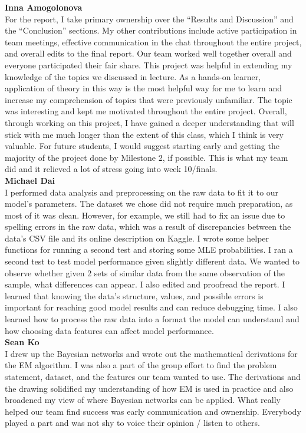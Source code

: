 \documentclass{article}
\begin{document}
\textbf{Inna Amogolonova}\\
For the report, I take primary ownership over the “Results and Discussion” and the “Conclusion” sections. My other contributions include active participation in team meetings, effective communication in the chat throughout the entire project, and overall edits to the final report. Our team worked well together overall and everyone participated their fair share. This project was helpful in extending my knowledge of the topics we discussed in lecture. As a hands-on learner, application of theory in this way is the most helpful way for me to learn and increase my comprehension of topics that were previously unfamiliar. The topic was interesting and kept me motivated throughout the entire project. Overall, through working on this project, I have gained a deeper understanding that will stick with me much longer than the extent of this class, which I think is very valuable. For future students, I would suggest starting early and getting the majority of the project done by Milestone 2, if possible. This is what my team did and it relieved a lot of stress going into week 10/finals. \\


\textbf{Michael Dai}\\
I performed data analysis and preprocessing on the raw data to fit it to our model’s parameters. The dataset we chose did not require much preparation, as most of it was clean. However, for example, we still had to fix an issue due to spelling errors in the raw data, which was a result of discrepancies between the data’s CSV file and its online description on Kaggle. I wrote some helper functions for running a second test and storing some MLE probabilities. I ran a second test to test model performance given slightly different data. We wanted to observe whether given 2 sets of similar data from the same observation of the sample, what differences can appear. I also edited and proofread the report. I learned that knowing the data’s structure, values, and possible errors is important for reaching good model results and can reduce debugging time. I also learned how to process the raw data into a format the model can understand and how choosing data features can affect model performance. \\

\textbf{Sean Ko}\\
I drew up the Bayesian networks and wrote out the mathematical derivations for the EM algorithm. I was also a part of the group effort to find the problem statement, dataset, and the features our team wanted to use. The derivations and the drawing solidified my understanding of how EM is used in practice and also broadened my view of where Bayesian networks can be applied. What really helped our team find success was early communication and ownership. Everybody played a part and was not shy to voice their opinion / listen to others.\\
\end{document}

